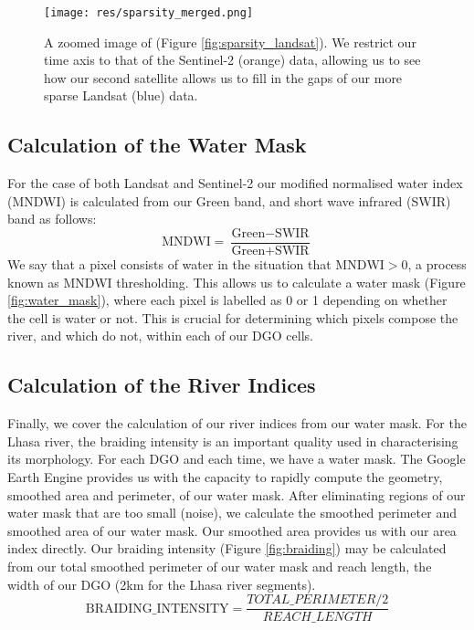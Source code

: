 \documentclass[12pt]{article}
\begin{document}
\begin{figure}[H]
    \centering
    \texttt{[image: res/sparsity\_merged.png]}
    \caption{A zoomed image of (Figure \ref{fig:sparsity_landsat}). We restrict our time axis to that of the Sentinel-2 (orange) data, allowing us to see how our second satellite allows us to fill in the gaps of our more sparse Landsat (blue) data.}
    \label{fig:sparsity_merged}
\end{figure}

\subsection{Calculation of the Water Mask}
For the case of both Landsat and Sentinel-2 our modified normalised water index (MNDWI)\cite{mndwi} is calculated from our Green band, and short wave infrared (SWIR) band as follows:
$$\text{MNDWI} = \frac{\text{Green} - \text{SWIR}}{\text{Green} + \text{SWIR}}$$
We say that a pixel consists of water in the situation that $\text{MNDWI} > 0$, a process known as MNDWI thresholding\cite{mndwi}. This allows us to calculate a water mask (Figure \ref{fig:water_mask}), where each pixel is labelled as 0 or 1 depending on whether the cell is water or not. This is crucial for determining which pixels compose the river, and which do not, within each of our DGO cells.


\subsection{Calculation of the River Indices}
Finally, we cover the calculation of our river indices from our water mask. For the Lhasa river, the braiding intensity is an important quality used in characterising its morphology. For each DGO and each time, we have a water mask. The Google Earth Engine provides us with the capacity to rapidly compute the geometry, smoothed area and perimeter, of our water mask. After eliminating regions of our water mask that are too small (noise), we calculate the smoothed perimeter and smoothed area of our water mask. Our smoothed area provides us with our area index directly. Our braiding intensity (Figure \ref{fig:braiding}) may be calculated from our total smoothed perimeter of our water mask and reach length, the width of our DGO (2km for the Lhasa river segments).
$$ \text{BRAIDING\_INTENSITY} = \frac{TOTAL\_PERIMETER/2}{REACH\_LENGTH} $$
\end{document}

